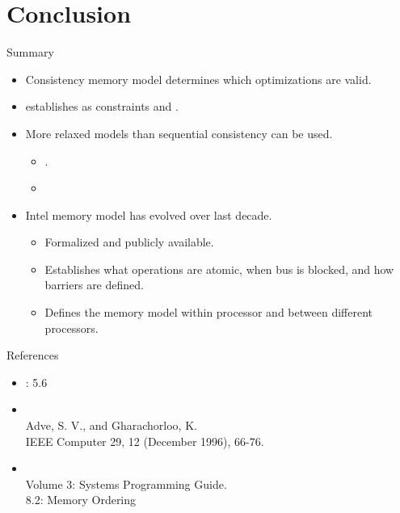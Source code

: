 \section{Conclusion}

\begin{frame}[t]{Summary}
\begin{itemize}
  \item Consistency memory model determines which optimizations are valid.
  \item {} establishes as constraints
         and .
  \item More relaxed models than sequential consistency can be used.
    \begin{itemize}
      \item {}.
      \item {}
    \end{itemize}
  \item Intel memory model has evolved over last decade.
    \begin{itemize}
      \item Formalized and publicly available.
      \item Establishes what operations are atomic, when bus is blocked, and how barriers are defined.
      \item Defines the memory model within processor and between different processors.
    \end{itemize}
\end{itemize}
\end{frame}


\begin{frame}[t]{References}
\begin{itemize}
  \item \bibhennessy
  : 5.6

  \item {}\\
        Adve, S. V., and Gharachorloo, K.\\
        IEEE Computer 29, 12 (December 1996), 66-76.

  \item {}\\
        Volume 3: Systems Programming Guide.\\
        8.2: Memory Ordering

\end{itemize}
\end{frame}
